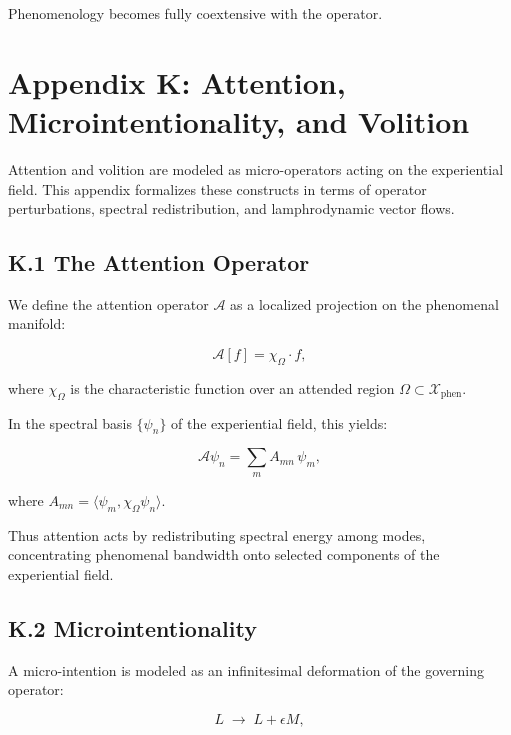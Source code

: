 \documentclass[12pt]{article}
\begin{document}
Phenomenology becomes fully coextensive with the operator.


\section*{Appendix K: Attention, Microintentionality, and Volition}

Attention and volition are modeled as micro-operators acting on the experiential
field. This appendix formalizes these constructs in terms of operator
perturbations, spectral redistribution, and lamphrodynamic vector flows.

\subsection*{K.1 The Attention Operator}

We define the attention operator $\mathcal{A}$ as a localized projection on the
phenomenal manifold:

\[
\mathcal{A}[f]
=
\chi_{\Omega} \cdot f,
\]

where $\chi_{\Omega}$ is the characteristic function over an attended region
$\Omega \subset \mathcal{X}_{\text{phen}}$.

In the spectral basis $\{\psi_n\}$ of the experiential field, this yields:

\[
\mathcal{A}\psi_n
=
\sum_{m} A_{mn}\,\psi_m,
\]

where $A_{mn} = \langle \psi_m, \chi_{\Omega}\psi_n \rangle$.  

Thus attention acts by redistributing spectral energy among modes, concentrating
phenomenal bandwidth onto selected components of the experiential field.

\subsection*{K.2 Microintentionality}

A micro-intention is modeled as an infinitesimal deformation of the governing
operator:

\[
L \;\to\; L + \epsilon M,
\]
\end{document}
